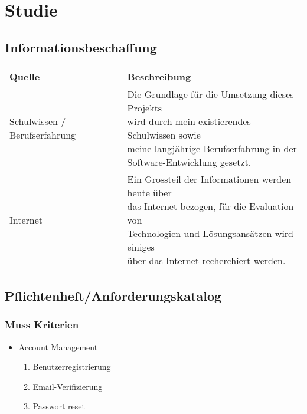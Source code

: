 \chapter{Studie}

\label{AppendixStudie}

\section{Informationsbeschaffung}\label{informationsbeschaffung}

\begin{longtable}[]{@{}ll@{}}
  \toprule
  Quelle                        & Beschreibung\tabularnewline
  \toprule
  Schulwissen / Berufserfahrung & \makecell[l]{Die Grundlage für die Umsetzung dieses Projekts   \\ wird durch mein existierendes Schulwissen sowie \\ meine langjährige Berufserfahrung in der \\ Software-Entwicklung gesetzt.} \tabularnewline
  \midrule
  Internet                      & \makecell[l]{Ein Grossteil der Informationen werden heute über \\ das Internet bezogen, für die Evaluation von \\ Technologien und Lösungsansätzen wird einiges \\ über das Internet recherchiert werden.} \tabularnewline
  \bottomrule
\end{longtable}

\section{Pflichtenheft/Anforderungskatalog}\label{pflichtenheftanforderungskatalog}

\subsection{Muss Kriterien}\label{muss-kriterien}

\begin{itemize}
  \tightlist
  \item
        Account Management
        \begin{enumerate}
          \def\labelenumi{\arabic{enumi}.}
          \tightlist
          \item
                Benutzerregistrierung
          \item
                Email-Verifizierung
          \item
                Passwort reset
        \end{enumerate}
\end{itemize}


